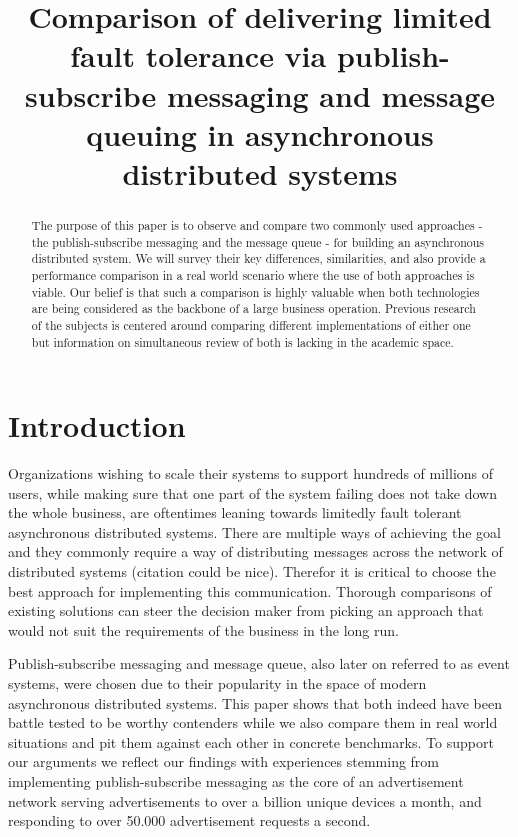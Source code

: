 \documentclass[conference]{IEEEtran}
\begin{document}
\title{Comparison of delivering limited fault tolerance via publish-subscribe messaging and message queuing in asynchronous distributed systems}

\author{
}

\maketitle

\begin{abstract}
The purpose of this paper is to observe and compare two commonly used approaches - the publish-subscribe messaging and the message queue - for building an asynchronous distributed system. We will survey their key differences, similarities, and also provide a performance comparison in a real world scenario where the use of both approaches is viable. Our belief is that such a comparison is highly valuable when both technologies are being considered as the backbone of a large business operation. Previous research of the subjects is centered around comparing different implementations of either one but information on simultaneous review of both is lacking in the academic space.
\end{abstract}

\section{Introduction}
Organizations wishing to scale their systems to support hundreds of millions of users, while making sure that one part of the system failing does not take down the whole business, are oftentimes leaning towards limitedly fault tolerant asynchronous distributed systems. There are multiple ways of achieving the goal and they commonly require a way of distributing messages across the network of distributed systems (citation could be nice). Therefor it is critical to choose the best approach for implementing this communication. Thorough comparisons of existing solutions can steer the decision maker from picking an approach that would not suit the requirements of the business in the long run.

Publish-subscribe messaging and message queue, also later on referred to as event systems, were chosen due to their popularity in the space of modern asynchronous distributed systems. This paper shows that both indeed have been battle tested to be worthy contenders while we also compare them in real world situations and pit them against each other in concrete benchmarks. To support our arguments we reflect our findings with experiences stemming from implementing publish-subscribe messaging as the core of an advertisement network serving advertisements to over a billion unique devices a month, and responding to over 50.000 advertisement requests a second.
\end{document}
